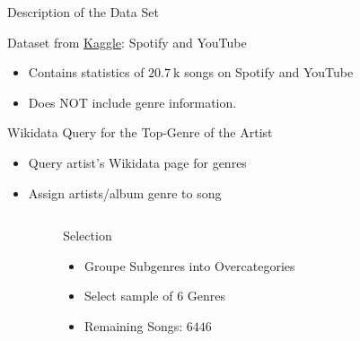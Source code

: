 \begin{frame}{Description of the Data Set}
    \begin{alertblock}{Dataset from \href{https://www.kaggle.com/datasets/salvatorerastelli/spotify-and-youtube}{Kaggle}: Spotify and YouTube}
      \begin{itemize}
        \item Contains statistics of $\SI{20.7}{\kilo}$ songs on Spotify and YouTube
        \item Does \alert{NOT} include genre information.
      \end{itemize}
    \end{alertblock}
    \begin{alertblock}{Wikidata Query for the Top-Genre of the Artist}
      \begin{itemize}
       \item Query artist’s Wikidata page for genres
       \item Assign artists/album genre to song
      \end{itemize}
    \end{alertblock}
    \vspace*{-0.5cm}
    \begin{columns}[t]
        \begin{column}{0.1\textwidth}
        \end{column}
        \begin{column}{0.3\textwidth}
            \begin{alertblock}{Selection}
                \begin{itemize}
                    \item Groupe Subgenres into Overcategories
                    \item Select sample of $\num{6}$ Genres
                    \item Remaining Songs: $\num{6446}$
                \end{itemize}
            \end{alertblock}
        \end{column}
        \begin{column}{0.8\textwidth}
            \begin{figure}

\end{figure}
\end{column}
\end{columns}
\end{frame}
